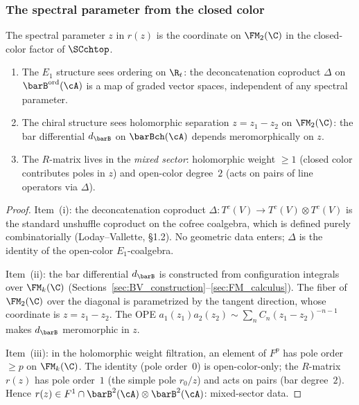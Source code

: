 \subsubsection*{The spectral parameter from the closed color}

\begin{theorem}
\label{thm:spectral-parameter-from-closed-color}
The spectral parameter $z$ in $r(z)$ is the coordinate on
$\FM_2(\C)$ in the closed-color factor of $\SCchtop$.
\begin{enumerate}[label=\textup{(\roman*)}]
\item The $E_1$ structure sees ordering on $\R_t$: the
 deconcatenation coproduct $\Delta$ on
 $\barB^{\mathrm{ord}}(\cA)$ is a map of graded vector spaces,
 independent of any spectral parameter.
\item The chiral structure sees holomorphic separation
 $z = z_1 - z_2$ on $\FM_2(\C)$: the bar differential
 $d_{\barB}$ on $\barBch(\cA)$ depends meromorphically on $z$.
\item The $R$-matrix lives in the \emph{mixed sector}:
 holomorphic weight $\ge 1$ (closed color contributes poles
 in $z$) and open-color degree~$2$ (acts on pairs of line
 operators via $\Delta$).
\end{enumerate}
\end{theorem}

\begin{proof}
Item~(i): the deconcatenation coproduct
$\Delta \colon T^c(V) \to T^c(V) \otimes T^c(V)$ is the
standard unshuffle coproduct on the cofree coalgebra, which is
defined purely combinatorially (Loday--Vallette, \S1.2). No
geometric data enters; $\Delta$ is the identity of the
open-color $E_1$-coalgebra.

Item~(ii): the bar differential $d_{\barB}$ is constructed
from configuration integrals over $\FM_k(\C)$
(Sections~\ref{sec:BV_construction}--\ref{sec:FM_calculus}).
The fiber of $\FM_2(\C)$ over the diagonal is parametrized by
the tangent direction, whose coordinate is $z = z_1 - z_2$.
The OPE $a_1(z_1) a_2(z_2) \sim \sum_n C_n (z_1-z_2)^{-n-1}$
makes $d_{\barB}$ meromorphic in $z$.

Item~(iii): in the holomorphic weight filtration, an element of
$F^p$ has pole order $\ge p$ on $\FM_k(\C)$. The identity
(pole order~$0$) is open-color-only; the $R$-matrix $r(z)$
has pole order~$1$ (the simple pole $r_0/z$) and acts on pairs
(bar degree~$2$). Hence $r(z) \in F^1 \cap
\barB^2(\cA) \otimes \barB^2(\cA)$: mixed-sector data.
\end{proof}

